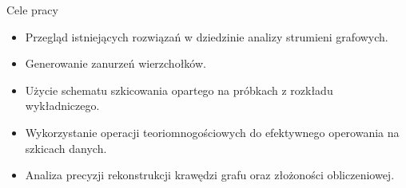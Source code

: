 \begin{frame}[squeeze]{Cele pracy}
    \begin{itemize}
        \setlength\itemsep{1em}
        \item Przegląd istniejących rozwiązań w dziedzinie analizy strumieni grafowych.
        \item Generowanie zanurzeń wierzchołków.
        \item Użycie schematu szkicowania opartego na próbkach z rozkładu wykładniczego.
        \item Wykorzystanie operacji teoriomnogościowych do efektywnego operowania na szkicach danych.
        \item Analiza precyzji rekonstrukcji krawędzi grafu oraz złożoności obliczeniowej.
    \end{itemize}
\end{frame}